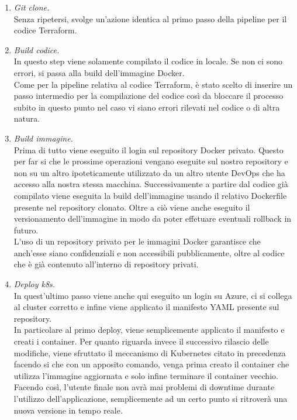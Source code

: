 \documentclass[a4paper,12pt]{report}
\begin{document}
\begin{enumerate}
\item \textit{Git clone.}\\
Senza ripetersi, svolge un'azione identica al primo passo della pipeline per il codice Terraform.\\
\item \textit{Build codice.}\\
In questo step viene solamente compilato il codice in locale. Se non ci sono errori, si passa alla build dell'immagine Docker.\\
Come per la pipeline relativa al codice Terraform, è stato scelto di inserire un passo intermedio per la compilazione del codice così da bloccare il processo subito in questo punto nel caso vi siano errori rilevati nel codice o di altra natura.\\
\item \textit{Build immagine.}\\
Prima di tutto viene eseguito il login sul repository Docker privato. Questo per far si che le prossime operazioni vengano eseguite sul nostro repository e non su un altro ipoteticamente utilizzato da un altro utente DevOps che ha accesso alla nostra stessa macchina. Successivamente a partire dal codice già compilato viene eseguita la build dell'immagine usando il relativo Dockerfile presente nel repository clonato. Oltre a ciò viene anche eseguito il versionamento dell'immagine in modo da poter effetuare eventuali rollback in futuro.\\
L'uso di un repository privato per le immagini Docker garantisce che anch'esse siano confidenziali e non accessibili pubblicamente, oltre al codice che è già contenuto all'interno di repository privati.\\
\item \textit{Deploy k8s.}\\
In quest'ultimo passo viene anche qui eseguito un login su Azure, ci si collega al cluster corretto e infine viene applicato il manifesto YAML presente sul repository.\\
In particolare al primo deploy, viene semplicemente applicato il manifesto e creati i container. Per quanto riguarda invece il successivo rilascio delle modifiche, viene sfruttato il meccanismo di Kubernetes citato in precedenza facendo si che con un apposito comando, venga prima creato il container che utilizza l'immagine aggiornata e solo infine terminare il container vecchio.\\
Facendo così, l'utente finale non avrà mai problemi di downtime durante l'utilizzo dell'applicazione, semplicemente ad un certo punto si ritroverà una nuova versione in tempo reale. \\ \\ \\ \\ \\ \\ \\ \\ \\ \\ \\ \\
\end{enumerate}
\end{document}
